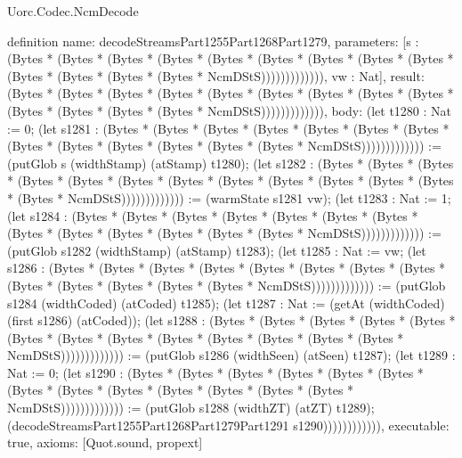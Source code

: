 \begin{lexlean}{Uorc.Codec.NcmDecode}
\begin{semanticmodule}
definition{
  name: decodeStreamsPart1255Part1268Part1279,
  parameters: [s : (Bytes * (Bytes * (Bytes * (Bytes * (Bytes * (Bytes * (Bytes * (Bytes * (Bytes * (Bytes * (Bytes * (Bytes * (Bytes * NcmDStS))))))))))))), vw : Nat],
  result: (Bytes * (Bytes * (Bytes * (Bytes * (Bytes * (Bytes * (Bytes * (Bytes * (Bytes * (Bytes * (Bytes * (Bytes * (Bytes * NcmDStS))))))))))))),
  body: (let t1280 : Nat := 0; (let s1281 : (Bytes * (Bytes * (Bytes * (Bytes * (Bytes * (Bytes * (Bytes * (Bytes * (Bytes * (Bytes * (Bytes * (Bytes * (Bytes * NcmDStS))))))))))))) := (putGlob s (widthStamp) (atStamp) t1280); (let s1282 : (Bytes * (Bytes * (Bytes * (Bytes * (Bytes * (Bytes * (Bytes * (Bytes * (Bytes * (Bytes * (Bytes * (Bytes * (Bytes * NcmDStS))))))))))))) := (warmState s1281 vw); (let t1283 : Nat := 1; (let s1284 : (Bytes * (Bytes * (Bytes * (Bytes * (Bytes * (Bytes * (Bytes * (Bytes * (Bytes * (Bytes * (Bytes * (Bytes * (Bytes * NcmDStS))))))))))))) := (putGlob s1282 (widthStamp) (atStamp) t1283); (let t1285 : Nat := vw; (let s1286 : (Bytes * (Bytes * (Bytes * (Bytes * (Bytes * (Bytes * (Bytes * (Bytes * (Bytes * (Bytes * (Bytes * (Bytes * (Bytes * NcmDStS))))))))))))) := (putGlob s1284 (widthCoded) (atCoded) t1285); (let t1287 : Nat := (getAt (widthCoded) (first s1286) (atCoded)); (let s1288 : (Bytes * (Bytes * (Bytes * (Bytes * (Bytes * (Bytes * (Bytes * (Bytes * (Bytes * (Bytes * (Bytes * (Bytes * (Bytes * NcmDStS))))))))))))) := (putGlob s1286 (widthSeen) (atSeen) t1287); (let t1289 : Nat := 0; (let s1290 : (Bytes * (Bytes * (Bytes * (Bytes * (Bytes * (Bytes * (Bytes * (Bytes * (Bytes * (Bytes * (Bytes * (Bytes * (Bytes * NcmDStS))))))))))))) := (putGlob s1288 (widthZT) (atZT) t1289); (decodeStreamsPart1255Part1268Part1279Part1291 s1290)))))))))))),
  executable: true,
  axioms: [Quot.sound, propext]
}


\end{semanticmodule}
\end{lexlean}
